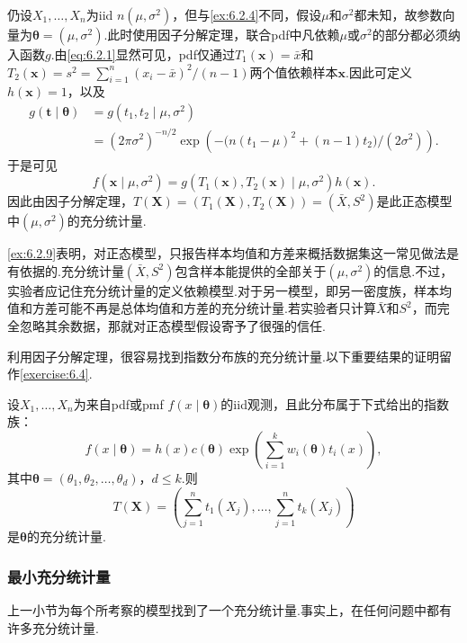 \begin{example}[两个参数均未知时的正态充分统计量]\label{ex:6.2.9}
仍设$X_1,\ldots,X_n$为iid $n(\mu,\sigma^2)$，但与\autoref{ex:6.2.4}不同，假设$\mu$和$\sigma^2$都未知，故参数向量为$\boldsymbol\theta=(\mu,\sigma^2)$.此时使用因子分解定理，联合pdf中凡依赖$\mu$或$\sigma^2$的部分都必须纳入函数$g$.由\eqref{eq:6.2.1}显然可见，pdf仅通过$T_1(\boldsymbol x)=\bar x$和$T_2(\boldsymbol x)=s^2=\sum_{i=1}^n(x_i-\bar x)^2/(n-1)$两个值依赖样本$\boldsymbol x$.因此可定义$h(\boldsymbol x)=1$，以及
\begin{align*}
g(\boldsymbol t\mid\boldsymbol\theta)&=g(t_1,t_2\mid\mu,\sigma^2)\\
&=(2\pi\sigma^2)^{-n/2}\exp\left(-\bigl(n(t_1-\mu)^2+(n-1)t_2\bigr)/(2\sigma^2)\right).
\end{align*}
于是可见
\begin{equation}\label{eq:6.2.5}
f(\boldsymbol x\mid\mu,\sigma^2)=g(T_1(\boldsymbol x),T_2(\boldsymbol x)\mid\mu,\sigma^2)h(\boldsymbol x).
\end{equation}
因此由因子分解定理，$T(\boldsymbol X)=(T_1(\boldsymbol X),T_2(\boldsymbol X))=(\bar X,S^2)$是此正态模型中$(\mu,\sigma^2)$的充分统计量.
\end{example}
\autoref{ex:6.2.9}表明，对正态模型，只报告样本均值和方差来概括数据集这一常见做法是有依据的.充分统计量$(\bar X,S^2)$包含样本能提供的全部关于$(\mu,\sigma^2)$的信息.不过，实验者应记住充分统计量的定义依赖模型.对于另一模型，即另一密度族，样本均值和方差可能不再是总体均值和方差的充分统计量.若实验者只计算$\bar X$和$S^2$，而完全忽略其余数据，那就对正态模型假设寄予了很强的信任.

利用因子分解定理，很容易找到指数分布族的充分统计量.以下重要结果的证明留作\autoref{exercise:6.4}.
\begin{theorem}\label{thm:6.2.10}
设$X_1,\ldots,X_n$为来自pdf或pmf $f(x\mid\boldsymbol\theta)$的iid观测，且此分布属于下式给出的指数族：
$$f(x\mid\boldsymbol\theta)=h(x)c(\boldsymbol\theta)\exp\left(\sum_{i=1}^k w_i(\boldsymbol\theta)t_i(x)\right),$$
其中$\boldsymbol\theta=(\theta_1,\theta_2,\ldots,\theta_d)$，$d\le k$.则
$$T(\boldsymbol X)=\left(\sum_{j=1}^nt_1(X_j),\ldots,\sum_{j=1}^nt_k(X_j)\right)$$
是$\boldsymbol\theta$的充分统计量.
\end{theorem}
\subsubsection{最小充分统计量}\label{sec:6.2.2}
上一小节为每个所考察的模型找到了一个充分统计量.事实上，在任何问题中都有许多充分统计量.

